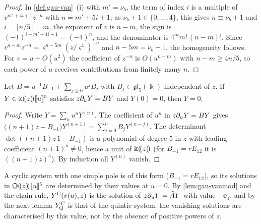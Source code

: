 \begin{proof}
In \cref{def:gau-van}~(i) with $m'=\nu_b$, the term of index $i$ is a multiple of $v^{m'+4i+1}z^{-n}$ with $n=m'+5i+1$; as $\nu_b+1\in\{0,\dots,4\}$, this gives $n\equiv\nu_b+1$ and $i=\lfloor n/5\rfloor=m$, the exponent of $v$ is $n-m$, the sign is $(-1)^{i+m'+4i+1}=(-1)^n$, and the denominator is $4^mm!\,(n-m)!$. Since $v^{n-m}z^{-n}=\varsigma^{n-5m}(z/\varsigma^4)^{-n}$ and $n-5m=\nu_b+1$, the homogeneity follows. For $v=u+O(u^2)$ the coefficient of $z^{-n}$ is $O(u^{n-m})$ with $n-m\geq4n/5$, so each power of $u$ receives contributions from finitely many $n$.
\end{proof}

\begin{lem}
\label{lem:gau-uniq}
Let $B=u^{-1}B_{-1}+\sum_{j\geq0}u^jB_j$ with $B_j\in\mathfrak{gl}_5(\Bbbk)$ independent of $z$. If $Y\in\Bbbk(\!(z)\!)[\![ u ]\!]^5$ satisfies $z\partial_uY=BY$ and $Y(0)=0$, then $Y=0$.
\end{lem}

\begin{proof}
Write $Y=\sum_nu^nY^{(n)}$. The coefficient of $u^n$ in $z\partial_uY=BY$ gives $\bigl((n+1)z-B_{-1}\bigr)Y^{(n+1)}=\sum_{j=0}^nB_jY^{(n-j)}$. The determinant $\det((n+1)z\,1-B_{-1})$ is a polynomial of degree $5$ in $z$ with leading coefficient $(n+1)^5\neq0$, hence a unit of $\Bbbk(\!(z)\!)$ (for $B_{-1}=rE_{12}$ it is $((n+1)z)^5$). By induction all $Y^{(n)}$ vanish.
\end{proof}

A cyclic system with one simple pole is of this form ($B_{-1}=rE_{12}$), so its solutions in $\mathbb{Q}(\!(z)\!)[\![ u ]\!]^5$ are determined by their values at $u=0$. By \cref{lem:gau-vanmod} and the chain rule, $Y^{\mathrm{C}}(v(u),z)$ is the solution of $z\partial_uY=\tilde AY$ with value $-\mathbf e_1$, and by the next lemma $Y^{\mathrm{C}}_{\mathrm{Q}}$ is that of the quintic system; the vanishing solutions are characterised by this value, not by the absence of positive powers of $z$.

